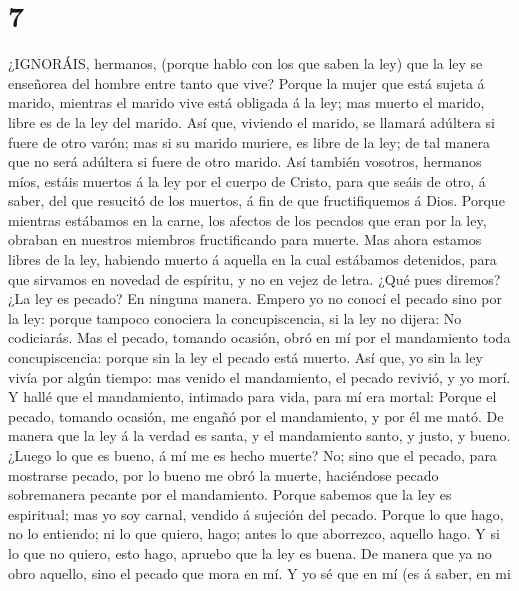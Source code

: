 \hypertarget{section-6}{%
\section{7}\label{section-6}}

 ¿IGNORÁIS, hermanos, (porque hablo con los que saben la
ley) que la ley se enseñorea del hombre entre tanto que vive?
 Porque la mujer que está sujeta á marido, mientras el
marido vive está obligada á la ley; mas muerto el marido, libre es de la
ley del marido.  Así que, viviendo el marido, se llamará
adúltera si fuere de otro varón; mas si su marido muriere, es libre de
la ley; de tal manera que no será adúltera si fuere de otro marido.
 Así también vosotros, hermanos míos, estáis muertos á la
ley por el cuerpo de Cristo, para que seáis de otro, á saber, del que
resucitó de los muertos, á fin de que fructifiquemos á Dios.
 Porque mientras estábamos en la carne, los afectos de los
pecados que eran por la ley, obraban en nuestros miembros fructificando
para muerte.  Mas ahora estamos libres de la ley, habiendo
muerto á aquella en la cual estábamos detenidos, para que sirvamos en
novedad de espíritu, y no en vejez de letra.  ¿Qué pues
diremos? ¿La ley es pecado? En ninguna manera. Empero yo no conocí el
pecado sino por la ley: porque tampoco conociera la concupiscencia, si
la ley no dijera: No codiciarás.  Mas el pecado, tomando
ocasión, obró en mí por el mandamiento toda concupiscencia: porque sin
la ley el pecado está muerto.  Así que, yo sin la ley vivía
por algún tiempo: mas venido el mandamiento, el pecado revivió, y yo
morí.  Y hallé que el mandamiento, intimado para vida, para
mí era mortal:  Porque el pecado, tomando ocasión, me
engañó por el mandamiento, y por él me mató.  De manera que
la ley á la verdad es santa, y el mandamiento santo, y justo, y bueno.
 ¿Luego lo que es bueno, á mí me es hecho muerte? No; sino
que el pecado, para mostrarse pecado, por lo bueno me obró la muerte,
haciéndose pecado sobremanera pecante por el mandamiento. 
Porque sabemos que la ley es espiritual; mas yo soy carnal, vendido á
sujeción del pecado.  Porque lo que hago, no lo entiendo;
ni lo que quiero, hago; antes lo que aborrezco, aquello hago.
 Y si lo que no quiero, esto hago, apruebo que la ley es
buena.  De manera que ya no obro aquello, sino el pecado
que mora en mí.  Y yo sé que en mí (es á saber, en mi
